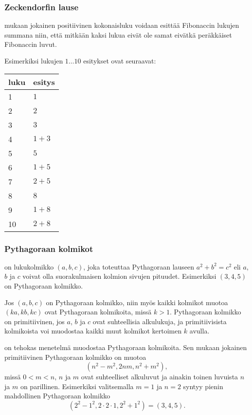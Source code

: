\subsubsection{Zeckendorfin lause}


 mukaan jokainen positiivinen kokonaisluku voidaan
esittää Fibonaccin lukujen summana niin, että
mitkään kaksi lukua eivät ole samat eivätkä peräkkäiset
Fibonaccin luvut.

Esimerkiksi lukujen $1 \ldots 10$ esitykset ovat seuraavat:

\begin{center}
\begin{tabular}{ll}
luku & esitys \\
\hline
1 & $1$ \\
2 & $2$ \\
3 & $3$ \\
4 & $1+3$ \\
5 & $5$ \\
6 & $1+5$ \\
7 & $2+5$ \\
8 & $8$ \\
9 & $1+8$ \\
10 & $2+8$ \\
\end{tabular}
\end{center}

\subsubsection{Pythagoraan kolmikot}


 on lukukolmikko $(a,b,c)$,
joka toteuttaa Pythagoraan lauseen $a^2+b^2=c^2$
eli $a$, $b$ ja $c$ voivat olla suorakulmaisen
kolmion sivujen pituudet.
Esimerkiksi $(3,4,5)$ on Pythagoraan kolmikko.

Jos $(a,b,c)$ on Pythagoraan kolmikko,
niin myös kaikki kolmikot muotoa $(ka,kb,kc)$
ovat Pythagoraan kolmikoita,
missä $k>1$.
Pythagoraan kolmikko on primitiivinen,
jos $a$, $b$ ja $c$ ovat suhteellisia alkulukuja,
ja primitiivisista kolmikoista voi muodostaa
kaikki muut kolmikot kertoimen $k$ avulla.

 on tehokas menetelmä muodostaa
Pythagoraan kolmikoita.
Sen mukaan jokainen primitiivinen
Pythagoraan kolmikko on muotoa
\[(n^2-m^2,2nm,n^2+m^2),\]
missä $0<m<n$, $n$ ja $m$ ovat suhteelliset
alkuluvut ja ainakin toinen luvuista $n$ ja $m$ on parillinen.
Esimerkiksi valitsemalla $m=1$ ja $n=2$ syntyy
pienin mahdollinen Pythagoraan kolmikko
\[(2^2-1^2,2\cdot2\cdot1,2^2+1^2)=(3,4,5).\]

